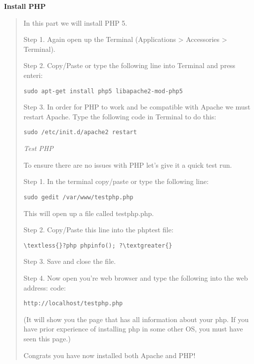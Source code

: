 \documentclass[letterpaper,10pt,english]{sphinxmanual}
\begin{document}
\textbf{Install PHP}
\begin{quote}

In this part we will install PHP 5.

Step 1. Again open up the Terminal (Applications \textgreater{} Accessories \textgreater{} Terminal).

Step 2. Copy/Paste or type the following line into Terminal and press enteri:

\begin{Verbatim}[commandchars=\\\{\}]
sudo apt-get install php5 libapache2-mod-php5
\end{Verbatim}

Step 3. In order for PHP to work and be compatible with Apache we must restart Apache. Type the following code in Terminal to do this:

\begin{Verbatim}[commandchars=\\\{\}]
sudo /etc/init.d/apache2 restart
\end{Verbatim}

\emph{Test PHP}

To ensure there are no issues with PHP let's give it a quick test run.

Step 1. In the terminal copy/paste or type the following line:

\begin{Verbatim}[commandchars=\\\{\}]
sudo gedit /var/www/testphp.php
\end{Verbatim}

This will open up a file called testphp.php.

Step 2. Copy/Paste this line into the phptest file:

\begin{Verbatim}[commandchars=\\\{\}]
\textless{}?php phpinfo(); ?\textgreater{}
\end{Verbatim}

Step 3. Save and close the file.

Step 4. Now open you're web browser and type the following into the web address: code:

\begin{Verbatim}[commandchars=\\\{\}]
http://localhost/testphp.php
\end{Verbatim}

(It will show you the page that has all information about your php. If you have prior experience of installing php
in some other OS, you must have seen this page.)

Congrats you have now installed both Apache and PHP!
\end{quote}
\end{document}
